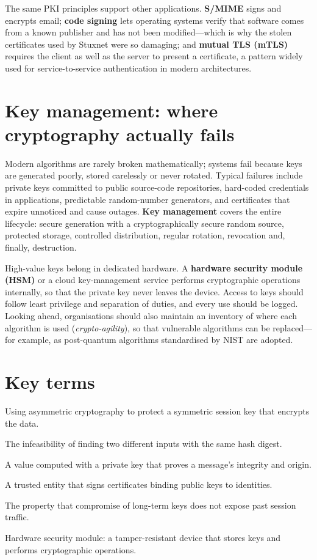 \documentclass[11pt,openany]{book}
\begin{document}
The same PKI principles support other applications. \textbf{S/MIME} signs and encrypts email; \textbf{code signing} lets operating systems verify that software comes from a known publisher and has not been modified—which is why the stolen certificates used by Stuxnet were so damaging; and \textbf{mutual TLS (mTLS)} requires the client as well as the server to present a certificate, a pattern widely used for service-to-service authentication in modern architectures.

\section{Key management: where cryptography actually fails}\label{sec:7.6}
Modern algorithms are rarely broken mathematically; systems fail because keys are generated poorly, stored carelessly or never rotated. Typical failures include private keys committed to public source-code repositories, hard-coded credentials in applications, predictable random-number generators, and certificates that expire unnoticed and cause outages. \textbf{Key management} covers the entire lifecycle: secure generation with a cryptographically secure random source, protected storage, controlled distribution, regular rotation, revocation and, finally, destruction.

High-value keys belong in dedicated hardware. A \textbf{hardware security module (HSM)} or a cloud key-management service performs cryptographic operations internally, so that the private key never leaves the device. Access to keys should follow least privilege and separation of duties, and every use should be logged. Looking ahead, organisations should also maintain an inventory of where each algorithm is used (\emph{crypto-agility}), so that vulnerable algorithms can be replaced—for example, as post-quantum algorithms standardised by NIST are adopted.

\section*{Key terms}
\begin{description}[style=nextline,leftmargin=1.2em]
  \item[Hybrid encryption] Using asymmetric cryptography to protect a symmetric session key that encrypts the data.
  \item[Collision resistance] The infeasibility of finding two different inputs with the same hash digest.
  \item[Digital signature] A value computed with a private key that proves a message's integrity and origin.
  \item[Certificate authority] A trusted entity that signs certificates binding public keys to identities.
  \item[Forward secrecy] The property that compromise of long-term keys does not expose past session traffic.
  \item[HSM] Hardware security module: a tamper-resistant device that stores keys and performs cryptographic operations.
\end{description}
\end{document}
